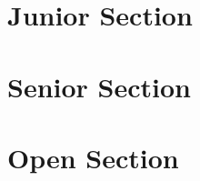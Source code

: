 \documentclass[a4paper,listof=totoc,bibliography=totoc,openany]{scrbook}
\begin{document}
\section{Junior Section}



\section{Senior Section}



\section{Open Section}


\end{document}
